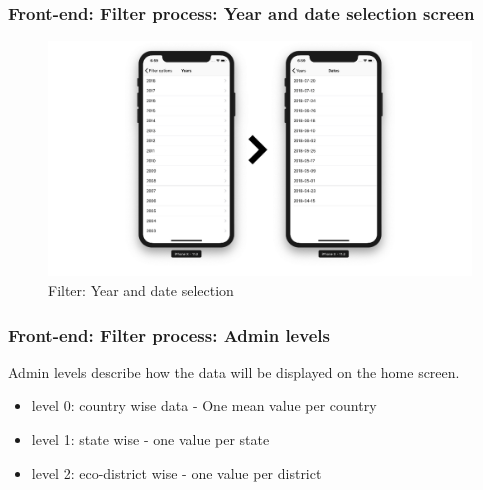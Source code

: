 \begin{frame}
\frametitle{Front-end: Filter process: Year and date selection screen}
    \begin{figure}[H]
            \centering
            \includegraphics[width=0.95\linewidth]{final/figures/filter_year.png}
            \caption{Filter: Year and date selection}
    \end{figure}
\end{frame}

\begin{frame}
\frametitle{Front-end: Filter process:  Admin levels}

    Admin levels describe how the data will be displayed on the home screen.

   \begin{itemize}
       \item level 0: country wise data - One mean value per country
       \item level 1: state wise - one value per state
       \item level 2: eco-district wise - one value per district
   \end{itemize}
\end{frame}

